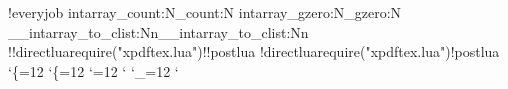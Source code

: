 \def\@@!postlua{%
\let\pdffilesize\tex_filesize:D\let\tex_filesize:D\undefined
\let\pdffiledump\tex_filedump:D\let\tex_filedump:D\undefined
\let\pdffilemoddate\tex_filemoddate:D\let\tex_filemoddate:D\undefined
\let\pdfstrcmp\tex_strcmp:D\let\tex_strcmp:D\undefined
\let\pdfmdfivesum\tex_mdfivesum:D\let\tex_mdfivesum:D\undefined
\let\pdfelapsedtime\__sys_elapsedtime:\let\__sys_elapsedtime:\undefined
\let\__intarray_gset_count:Nw\@undefined
\let\intarray_count:N\@@!intarray_count:N
\let\intarray_gzero:N\@@!intarray_gzero:N
\let\__intarray_to_clist:Nn\@@!__intarray_to_clist:Nn
\protected\edef\pdfshellescape{\numexpr\@@!directlua{tex.sprint(status.shell_escape)}\relax}
}
\def\@@!tmp{}
\@@!everyjob{%
\let\@@!intarray_count:N\intarray_count:N
\let\@@!intarray_gzero:N\intarray_gzero:N
\let\@@!__intarray_to_clist:Nn\__intarray_to_clist:Nn
\@@!directlua{require("xpdftex.lua")}\@@!postlua\the\everyjob
\protected\def\write{\@@!directlua{xpdftex.write_or_execute()}}%
}
\@@!directlua{require("xpdftex.lua")}\@@!postlua
\catcode`\{=12
\catcode`\{=12
\catcode`\@=12
\catcode`
\catcode`\_=12
\catcode`

